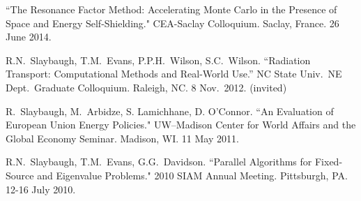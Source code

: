 \begin{bibsection}
\item ``The Resonance Factor Method: Accelerating Monte Carlo in the Presence of Space and Energy Self-Shielding." CEA-Saclay Colloquium. Saclay, France. 26 June 2014.



\item R.N.\ Slaybaugh, T.M.\ Evans, P.P.H.\ Wilson, S.C.\ Wilson. ``Radiation Transport: Computational Methods and Real-World Use.'' NC State Univ.\ NE Dept.\ Graduate Colloquium. Raleigh, NC. 8 Nov.\ 2012. (invited)


\item R.\ Slaybaugh, M.\ Arbidze, S. Lamichhane, D. O'Connor. ``An Evaluation of European Union Energy Policies." UW--Madison Center for World Affairs and the Global Economy Seminar. Madison, WI. 11 May 2011.


\item R.N.\ Slaybaugh, T.M.\ Evans, G.G.\ Davidson. ``Parallel Algorithms for Fixed-Source and Eigenvalue Problems." 2010 SIAM Annual Meeting. Pittsburgh, PA. 12-16 July 2010.



\end{bibsection}


